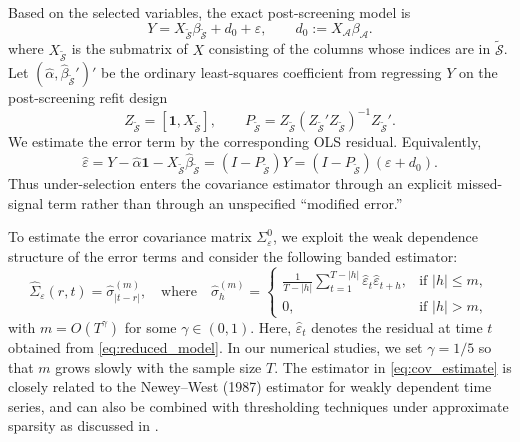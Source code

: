 ﻿\documentclass[12pt]{article}
\newcommand{\0}{\mbox{\bf 0}}
\theoremstyle{plain}%
\theoremstyle{definition}
\begin{document}
{Based on the selected variables, the exact post-screening model is
\begin{equation}
Y = X_{\widetilde{\mathcal{S}}} \beta_{\widetilde{\mathcal{S}}}
    +d_0+\varepsilon,\qquad
d_0:=X_{\mathcal A}\beta_{\mathcal A}. \label{eq:reduced_model}
\end{equation}
where $X_{\widetilde{\mathcal{S}}}$ is the submatrix of $X$ consisting of the
columns whose indices are in $\widetilde{\mathcal{S}}$.  Let
$(\widehat\alpha,\widehat\beta_{\widetilde{\mathcal S}}')'$ be the ordinary
least-squares coefficient from regressing $Y$ on the post-screening refit
design
\[
Z_{\widetilde{\mathcal S}}=[\mathbf 1,X_{\widetilde{\mathcal S}}],
\qquad
P_{\widetilde{\mathcal S}}
=Z_{\widetilde{\mathcal S}}
(Z_{\widetilde{\mathcal S}}'Z_{\widetilde{\mathcal S}})^{-1}
Z_{\widetilde{\mathcal S}}'.
\]
We estimate the error term by the corresponding OLS residual.  Equivalently,
\[
\widehat\varepsilon
=Y-\widehat\alpha\mathbf 1
-X_{\widetilde{\mathcal S}}\widehat\beta_{\widetilde{\mathcal S}}
=(I-P_{\widetilde{\mathcal S}})Y
=(I-P_{\widetilde{\mathcal S}})(\varepsilon+d_0).
\]
Thus under-selection enters the covariance estimator through an explicit
missed-signal term rather than through an unspecified ``modified error.''



To estimate the error covariance matrix $\Sigma_{\varepsilon}^{0}$, we exploit the weak dependence structure of the error terms and consider the following banded estimator:
\begin{equation} \label{eq:cov_estimate}
\widehat{\Sigma}_{\varepsilon}(r,t) = \widehat{\sigma}_{|t - r|}^{(m)}, \quad \text{where} \quad
\widehat{\sigma}_{h}^{(m)} = 
\begin{cases}
\displaystyle\frac{1}{T - |h|} \sum_{t=1}^{T - |h|} \widehat{\varepsilon}_t \widehat{\varepsilon}_{t + h}, & \text{if } |h| \leq m, \\
0, & \text{if } |h| > m,
\end{cases}
\end{equation}
with $m = O(T^{\gamma})$ for some $\gamma \in (0,1)$. Here, $\widehat{\varepsilon}_t$ denotes the residual at time $t$ obtained from \eqref{eq:reduced_model}. In our numerical studies, we set $\gamma = 1/5$ so that $m$ grows slowly with the sample size $T$. The estimator in \eqref{eq:cov_estimate} is closely related to the Newey--West (1987) estimator for weakly dependent time series, and can also be combined with thresholding techniques under approximate sparsity as discussed in \citet{FanLiaoMincheva2011}.

}
\end{document}
